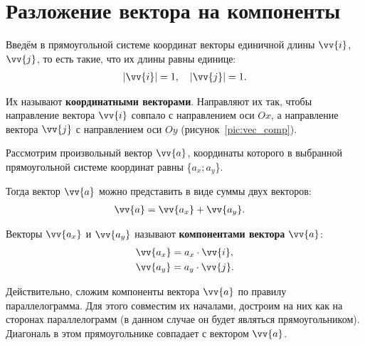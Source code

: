 \section{Разложение вектора на компоненты}
Введём в прямоугольной системе координат векторы единичной длины
$\vv{i}$, $\vv{j}$, то есть такие, что их длины равны единице:
\begin{align}
  |\vv{i}| = 1, \quad |\vv{j}| = 1.
\end{align}

Их называют \textbf{координатными векторами}.
Направляют их так, чтобы направление вектора $\vv{i}$ совпало с
направлением оси $Ox$, а направление вектора $\vv{j}$ \bdash
с направлением оси $Oy$ (рисунок~\ref{pic:vec_comp}).

Рассмотрим произвольный вектор $\vv{a}$, координаты которого в выбранной
прямоугольной системе координат равны \{$a_x; a_y$\}.

Тогда вектор $\vv{a}$ можно представить в виде суммы двух векторов:
\begin{align}
  &\vv{a} = \vv{a_x} + \vv{a_y}.
\end{align}

Векторы $\vv{a_x}$ и $\vv{a_y}$ называют \textbf{компонентами вектора} $\vv{a}$:
\begin{align}
  &\vv{a_x} = a_x\cdot \vv{i},\\
  &\vv{a_y} = a_y\cdot \vv{j}.
\end{align}

Действительно, сложим компоненты вектора $\vv{a}$ по правилу параллелограмма.
Для этого совместим их началами, достроим на них как на сторонах
параллелограмм (в данном случае он будет являться прямоугольником).
Диагональ в этом прямоугольнике совпадает с вектором $\vv{a}$.

